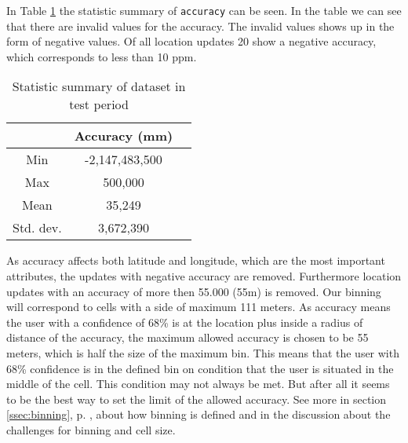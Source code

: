 In Table \ref{tab:stat_geo_p1} the statistic summary of \texttt{accuracy} can be seen. 
In the table we can see that there are invalid values for the accuracy. The invalid values shows up in the form of negative values. 
Of all location updates 20 show a negative accuracy, which corresponds to less than 10 ppm.  


\begin{table}[H]
        \centering
        \small
        \setlength\tabcolsep{2pt}
        \begin{tabular}{|c|c|c|}
            \hline
                         & Accuracy (mm)          \\[0pt]
            \hline
                 Min     &  -2,147,483,500             \\
            \hline
                 Max     &  500,000                \\
            \hline
                 Mean    & 35,249                      \\
            \hline
                Std. dev.   & 3,672,390                \\
            \hline
        \end{tabular}
        \caption{Statistic summary of dataset in test period}
        \label{tab:stat_geo_p1}
\end{table}

As accuracy affects both latitude and longitude, which are the most important attributes, the updates with negative accuracy are removed. Furthermore location updates with an accuracy of more then 55.000 (55m) is removed. Our binning will correspond to cells with a side of maximum 111 meters. As accuracy means the user with a confidence of 68\% is at the location plus inside a radius of distance of the accuracy, the maximum allowed accuracy is chosen to be 55 meters, which is half the size of the maximum bin. This means that the user with 68\% confidence is in the defined bin on condition that the user is situated in the middle of the cell. This condition may not always be met. But after all it seems to be the best way to set the limit of the allowed accuracy. 
See more in section \ref{ssec:binning}, p. \pageref{ssec:binning}, about how binning is defined and in the discussion about the challenges for binning and cell size. 


